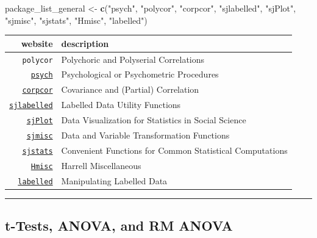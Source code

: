 \documentclass[]{book}
\newenvironment{Shaded}{\begin{snugshade}}{\end{snugshade}}
\newcommand{\KeywordTok}[1]{\textcolor[rgb]{0.13,0.29,0.53}{\textbf{#1}}}
\newcommand{\StringTok}[1]{\textcolor[rgb]{0.31,0.60,0.02}{#1}}
\newcommand{\NormalTok}[1]{#1}
\theoremstyle{definition}
\theoremstyle{definition}
\theoremstyle{definition}
\theoremstyle{remark}
\begin{document}
\begin{Shaded}
\begin{Highlighting}[]
\NormalTok{package_list_general <-}\StringTok{ }\KeywordTok{c}\NormalTok{(}\StringTok{"psych"}\NormalTok{,}
                          \StringTok{"polycor"}\NormalTok{, }
                          \StringTok{"corpcor"}\NormalTok{,}
                          \StringTok{"sjlabelled"}\NormalTok{, }
                          \StringTok{"sjPlot"}\NormalTok{, }
                          \StringTok{"sjmisc"}\NormalTok{,}
                          \StringTok{"sjstats"}\NormalTok{,}
                          \StringTok{"Hmisc"}\NormalTok{,}
                          \StringTok{"labelled"}\NormalTok{)}
\end{Highlighting}
\end{Shaded}

\begin{longtable}[]{@{}rl@{}}
\toprule
website & description\tabularnewline
\midrule
\endhead
\texttt{polycor} & Polychoric and Polyserial Correlations\tabularnewline
\href{http://personality-project.org/r/psych/}{\texttt{psych}} &
Psychological or Psychometric Procedures\tabularnewline
\href{http://strimmerlab.org/software/corpcor/}{\texttt{corpcor}} &
Covariance and (Partial) Correlation\tabularnewline
\href{https://strengejacke.github.io/sjlabelled/}{\texttt{sjlabelled}} &
Labelled Data Utility Functions\tabularnewline
\href{http://www.strengejacke.de/sjPlot/}{\texttt{sjPlot}} & Data
Visualization for Statistics in Social Science\tabularnewline
\href{http://www.strengejacke.de/sjmisc/}{\texttt{sjmisc}} & Data and
Variable Transformation Functions\tabularnewline
\href{http://www.strengejacke.de/sjstats/}{\texttt{sjstats}} &
Convenient Functions for Common Statistical Computations\tabularnewline
\href{http://biostat.mc.vanderbilt.edu/wiki/Main/Hmisc}{\texttt{Hmisc}}
& Harrell Miscellaneous\tabularnewline
\href{https://github.com/larmarange/labelled}{\texttt{labelled}} &
Manipulating Labelled Data\tabularnewline
\bottomrule
\end{longtable}

\begin{center}\rule{0.5\linewidth}{\linethickness}\end{center}

\subsection{t-Tests, ANOVA, and RM
ANOVA}\label{t-tests-anova-and-rm-anova}
\end{document}
